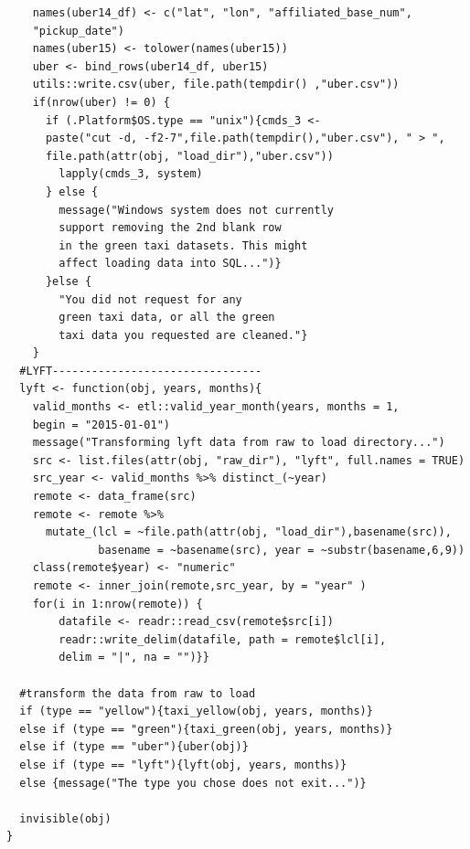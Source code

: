 \documentclass[12pt,twoside]{reedthesis}
\theoremstyle{definition}
\theoremstyle{definition}
\theoremstyle{definition}
\theoremstyle{remark}
\begin{document}
\begin{verbatim}
    names(uber14_df) <- c("lat", "lon", "affiliated_base_num", 
    "pickup_date")
    names(uber15) <- tolower(names(uber15))
    uber <- bind_rows(uber14_df, uber15)
    utils::write.csv(uber, file.path(tempdir() ,"uber.csv"))
    if(nrow(uber) != 0) {
      if (.Platform$OS.type == "unix"){cmds_3 <- 
      paste("cut -d, -f2-7",file.path(tempdir(),"uber.csv"), " > ", 
      file.path(attr(obj, "load_dir"),"uber.csv"))
        lapply(cmds_3, system)
      } else {
        message("Windows system does not currently 
        support removing the 2nd blank row 
        in the green taxi datasets. This might
        affect loading data into SQL...")}
      }else {
        "You did not request for any 
        green taxi data, or all the green 
        taxi data you requested are cleaned."}
    }
  #LYFT--------------------------------
  lyft <- function(obj, years, months){
    valid_months <- etl::valid_year_month(years, months = 1, 
    begin = "2015-01-01")
    message("Transforming lyft data from raw to load directory...")
    src <- list.files(attr(obj, "raw_dir"), "lyft", full.names = TRUE)
    src_year <- valid_months %>% distinct_(~year)
    remote <- data_frame(src)
    remote <- remote %>%
      mutate_(lcl = ~file.path(attr(obj, "load_dir"),basename(src)),
              basename = ~basename(src), year = ~substr(basename,6,9))
    class(remote$year) <- "numeric"
    remote <- inner_join(remote,src_year, by = "year" )
    for(i in 1:nrow(remote)) {
        datafile <- readr::read_csv(remote$src[i])
        readr::write_delim(datafile, path = remote$lcl[i], 
        delim = "|", na = "")}}
  
  #transform the data from raw to load
  if (type == "yellow"){taxi_yellow(obj, years, months)} 
  else if (type == "green"){taxi_green(obj, years, months)}
  else if (type == "uber"){uber(obj)}
  else if (type == "lyft"){lyft(obj, years, months)}
  else {message("The type you chose does not exit...")}
  
  invisible(obj)
}
\end{verbatim}
\end{document}
